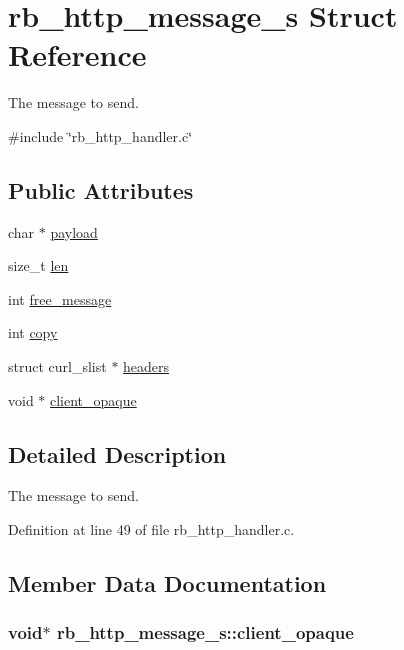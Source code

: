 \hypertarget{structrb__http__message__s}{\section{rb\-\_\-http\-\_\-message\-\_\-s Struct Reference}
\label{structrb__http__message__s}
}


The message to send.  




{\ttfamily \#include \char`\"{}rb\-\_\-http\-\_\-handler.\-c\char`\"{}}

\subsection*{Public Attributes}
\begin{DoxyCompactItemize}
\item 
char $\ast$ \hyperlink{structrb__http__message__s_a70cd28f794d09eb47cf19a37fb7ba42b}{payload}
\item 
size\-\_\-t \hyperlink{structrb__http__message__s_a8c352ee939f1cd197bf009583e61552f}{len}
\item 
int \hyperlink{structrb__http__message__s_acbfdd79b7ec041a7b7e0edac1da72d30}{free\-\_\-message}
\item 
int \hyperlink{structrb__http__message__s_aceda798a9af4f28a6dc89b273e6c348a}{copy}
\item 
struct curl\-\_\-slist $\ast$ \hyperlink{structrb__http__message__s_ae12176a1bd60ed536eda95e2c530acc4}{headers}
\item 
void $\ast$ \hyperlink{structrb__http__message__s_aa25eb69a09434b70882260a326dd704c}{client\-\_\-opaque}
\end{DoxyCompactItemize}


\subsection{Detailed Description}
The message to send. 

Definition at line 49 of file rb\-\_\-http\-\_\-handler.\-c.



\subsection{Member Data Documentation}
\hypertarget{structrb__http__message__s_aa25eb69a09434b70882260a326dd704c}{
\subsubsection[{client\-\_\-opaque}]{\setlength{\rightskip}{0pt plus 5cm}void$\ast$ rb\-\_\-http\-\_\-message\-\_\-s\-::client\-\_\-opaque}}\label{structrb__http__message__s_aa25eb69a09434b70882260a326dd704c}


